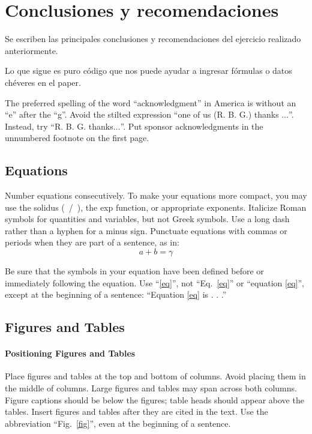 \documentclass[conference, 10pt]{IEEEtran}
\begin{document}
\section{Conclusiones y recomendaciones}

Se escriben las principales conclusiones y recomendaciones del ejercicio realizado anteriormente.

Lo que sigue es puro código que nos puede ayudar a ingresar fórmulas o datos chéveres en el paper.


The preferred spelling of the word ``acknowledgment'' in America is without 
an ``e'' after the ``g''. Avoid the stilted expression ``one of us (R. B. 
G.) thanks $\ldots$''. Instead, try ``R. B. G. thanks$\ldots$''. Put sponsor 
acknowledgments in the unnumbered footnote on the first page.

\subsection{Equations}
Number equations consecutively. To make your 
equations more compact, you may use the solidus (~/~), the exp function, or 
appropriate exponents. Italicize Roman symbols for quantities and variables, 
but not Greek symbols. Use a long dash rather than a hyphen for a minus 
sign. Punctuate equations with commas or periods when they are part of a 
sentence, as in:
\begin{equation}
a+b=\gamma\label{eq}
\end{equation}

Be sure that the 
symbols in your equation have been defined before or immediately following 
the equation. Use ``\eqref{eq}'', not ``Eq.~\eqref{eq}'' or ``equation \eqref{eq}'', except at 
the beginning of a sentence: ``Equation \eqref{eq} is . . .''



\subsection{Figures and Tables}
\paragraph{Positioning Figures and Tables} Place figures and tables at the top and 
bottom of columns. Avoid placing them in the middle of columns. Large 
figures and tables may span across both columns. Figure captions should be 
below the figures; table heads should appear above the tables. Insert 
figures and tables after they are cited in the text. Use the abbreviation 
``Fig.~\ref{fig}'', even at the beginning of a sentence.
\end{document}
